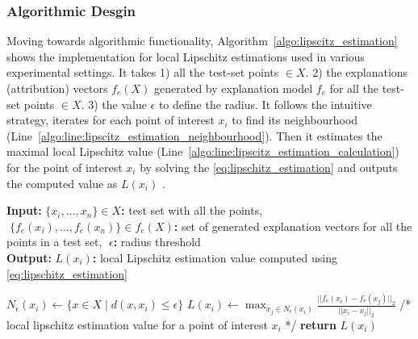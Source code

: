 \documentclass[english]{tktltiki2}
\theoremstyle{definition}
\theoremstyle{remark}
\newcommand{\multicommentsymbolstart}{/*}
\newcommand{\multicommentsymbolend}{*/}
\newcommand{\MultiLineComment}[2][\algorithmicindent]{\Statex \hspace{#1}\multicommentsymbolstart{} #2 \multicommentsymbolend{}}
\newcommand{\onespace}{\;}
\begin{document}
\subsubsection{Algorithmic Desgin}\label{sec:algorithmic_desgin} %
Moving towards algorithmic functionality, Algorithm~\ref{algo:lipscitz_estimation} shows the implementation for local Lipschitz estimations used in various experimental settings. It takes 1) all the test-set points $ \in X$. 2) the explanations (attribution) vectors $f_e(X)$ generated by explanation model $f_e$  for all the test-set points $\in X$. 3) the value $\epsilon$ to define the radius. It follows the intuitive strategy, iterates for each point of interest $x_i$ to find its neighbourhood (Line~\ref{algo:line:lipscitz_estimation_neighbourhood}). Then it estimates the maximal local Lipschitz value (Line~\ref{algo:line:lipscitz_estimation_calculation}) for the point of interest $x_i$ by solving the \eqref{eq:lipschitz_estimation} and outputs the computed value as $L(x_i)$ .

\begin{algorithm}[H]
	\caption{$LipschitzEstimations(X,\onespace f_e(X),\onespace \epsilon)$}
	\label{algo:lipscitz_estimation}
	\hspace*{\algorithmicindent} \textbf{Input}\textbf{:} $\{x_i,...,x_n\} \in X$\textbf{:} test set with all the points, $\onespace \{f_e(x_i),...,f_e(x_n)\} \in f_e(X)$\textbf{:} set of generated explanation vectors for all the points in a test set, $\onespace \epsilon$\textbf{:} radius threshold \\
	\hspace*{\algorithmicindent} \textbf{Output}\textbf{:} $L(x_i)$\textbf{:} local Lipschitz estimation value computed using \eqref{eq:lipschitz_estimation}
	\begin{algorithmic}[1]
		\State \label{algo:line:lipscitz_estimation_neighbourhood} $N_\epsilon(x_i)\leftarrow \{x\in X\mid d(x,x_i)\le \epsilon\}$ \Comment {\eqref{eq:neighbourhood}}
		\State \label{algo:line:lipscitz_estimation_calculation} $L(x_i) \gets \operatorname*{max}_{x_j \in N_\epsilon(x_i)} \frac{||f_e(x_i) - f_e(x_j)||_2}{||x_i - x_j||_2}$ \Comment {\eqref{eq:lipschitz_estimation}}
		\EndFor
		\MultiLineComment[0\dimexpr\algorithmicindent]{local lipschitz estimation value for a point of interest $x_i$}
		\State \textbf{return} $L(x_i)$
	\end{algorithmic}
\end{algorithm}
\end{document}
